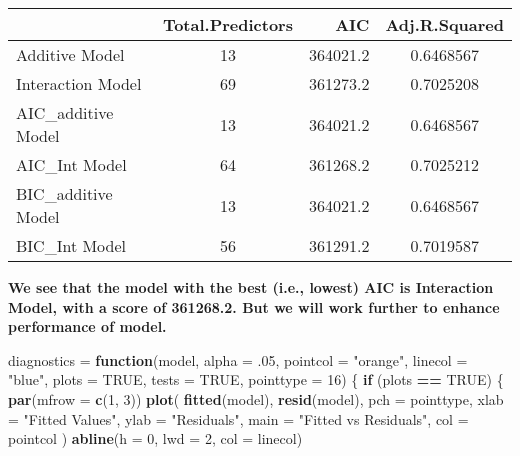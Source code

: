 \documentclass[
]{article}
\newenvironment{Shaded}{\begin{snugshade}}{\end{snugshade}}
\newcommand{\ControlFlowTok}[1]{\textcolor[rgb]{0.13,0.29,0.53}{\textbf{#1}}}
\newcommand{\DataTypeTok}[1]{\textcolor[rgb]{0.13,0.29,0.53}{#1}}
\newcommand{\DecValTok}[1]{\textcolor[rgb]{0.00,0.00,0.81}{#1}}
\newcommand{\FloatTok}[1]{\textcolor[rgb]{0.00,0.00,0.81}{#1}}
\newcommand{\KeywordTok}[1]{\textcolor[rgb]{0.13,0.29,0.53}{\textbf{#1}}}
\newcommand{\NormalTok}[1]{#1}
\newcommand{\OperatorTok}[1]{\textcolor[rgb]{0.81,0.36,0.00}{\textbf{#1}}}
\newcommand{\OtherTok}[1]{\textcolor[rgb]{0.56,0.35,0.01}{#1}}
\newcommand{\StringTok}[1]{\textcolor[rgb]{0.31,0.60,0.02}{#1}}
\begin{document}
\begin{longtable}[]{@{}lcrc@{}}
\toprule
& Total.Predictors & AIC & Adj.R.Squared\tabularnewline
\midrule
\endhead
Additive Model & 13 & 364021.2 & 0.6468567\tabularnewline
Interaction Model & 69 & 361273.2 & 0.7025208\tabularnewline
AIC\_additive Model & 13 & 364021.2 & 0.6468567\tabularnewline
AIC\_Int Model & 64 & 361268.2 & 0.7025212\tabularnewline
BIC\_additive Model & 13 & 364021.2 & 0.6468567\tabularnewline
BIC\_Int Model & 56 & 361291.2 & 0.7019587\tabularnewline
\bottomrule
\end{longtable}

\textbf{We see that the model with the best (i.e., lowest) AIC is
Interaction Model, with a score of 361268.2. But we will work further to
enhance performance of model.}

\begin{Shaded}
\begin{Highlighting}[]
\NormalTok{diagnostics =}\StringTok{ }\ControlFlowTok{function}\NormalTok{(model, }\DataTypeTok{alpha =} \FloatTok{.05}\NormalTok{, }\DataTypeTok{pointcol =} \StringTok{"orange"}\NormalTok{, }\DataTypeTok{linecol =} \StringTok{"blue"}\NormalTok{, }\DataTypeTok{plots =} \OtherTok{TRUE}\NormalTok{, }\DataTypeTok{tests =} \OtherTok{TRUE}\NormalTok{, }\DataTypeTok{pointtype =} \DecValTok{16}\NormalTok{) \{}
    \ControlFlowTok{if}\NormalTok{ (plots }\OperatorTok{==}\StringTok{ }\OtherTok{TRUE}\NormalTok{) \{}
        \KeywordTok{par}\NormalTok{(}\DataTypeTok{mfrow =} \KeywordTok{c}\NormalTok{(}\DecValTok{1}\NormalTok{, }\DecValTok{3}\NormalTok{))}
        \KeywordTok{plot}\NormalTok{(}
                \KeywordTok{fitted}\NormalTok{(model),}
                \KeywordTok{resid}\NormalTok{(model),}
                \DataTypeTok{pch =}\NormalTok{ pointtype,}
                \DataTypeTok{xlab =} \StringTok{"Fitted Values"}\NormalTok{,}
                \DataTypeTok{ylab =} \StringTok{"Residuals"}\NormalTok{,}
                \DataTypeTok{main =} \StringTok{"Fitted vs Residuals"}\NormalTok{,}
                \DataTypeTok{col =}\NormalTok{ pointcol}
\NormalTok{            )}
        \KeywordTok{abline}\NormalTok{(}\DataTypeTok{h =} \DecValTok{0}\NormalTok{, }\DataTypeTok{lwd =} \DecValTok{2}\NormalTok{, }\DataTypeTok{col =}\NormalTok{ linecol)}
        

\end{Highlighting}
\end{Shaded}
\end{document}
